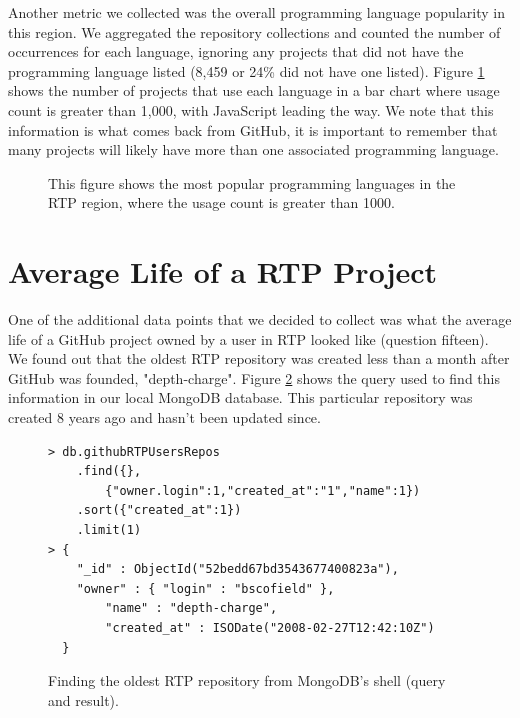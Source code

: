 Another metric we collected was the overall programming language popularity in this region. We aggregated the repository collections and counted the number of occurrences for each language, ignoring any projects that did not have the programming language listed (8,459 or 24\% did not have one listed). Figure \ref{fig-progLangPopularity} shows the number of projects that use each language in a bar chart where usage count is greater than 1,000, with JavaScript leading the way. We note that this information is what comes back from GitHub, it is important to remember that many projects will likely have more than one associated programming language.

\begin{figure}
\begin{bchart}[max=5.467,width=.9\textwidth]
 \end{bchart}
\caption{This figure shows the most popular programming languages in the RTP region, where the usage count is greater than 1000.}
\label{fig-progLangPopularity}
\end{figure}


\section{Average Life of a RTP Project}
\label{sec-lifeOfAProj}
One of the additional data points that we decided to collect was what the average life of a GitHub project owned by a user in RTP looked like (question fifteen). We found out that the oldest RTP repository was created less than a month after GitHub was founded, "depth-charge". Figure \ref{fig-mongoqueryOldestRTPRepo} shows the query used to find this information in our local MongoDB database. This particular repository was created 8 years ago and hasn't been updated since.

\begin{figure}
\label{fig-mongoqueryOldestRTPRepo}
\begin{lstlisting}
> db.githubRTPUsersRepos
	.find({},
    	{"owner.login":1,"created_at":"1","name":1})
    .sort({"created_at":1})
    .limit(1)
> { 
	"_id" : ObjectId("52bedd67bd3543677400823a"), 
	"owner" : { "login" : "bscofield" }, 
    	"name" : "depth-charge", 
    	"created_at" : ISODate("2008-02-27T12:42:10Z") 
  }
\end{lstlisting}
\caption{Finding the oldest RTP repository from MongoDB's shell  (query and result).}
\end{figure}


